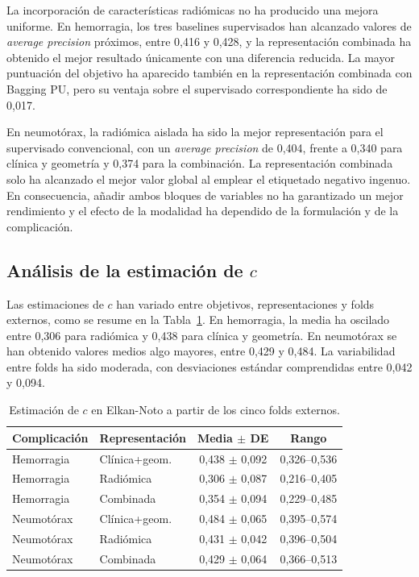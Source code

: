 La incorporación de características radiómicas no ha producido una mejora uniforme. En hemorragia, los tres baselines supervisados han alcanzado valores de \textit{average precision} próximos, entre 0,416 y 0,428, y la representación combinada ha obtenido el mejor resultado únicamente con una diferencia reducida. La mayor puntuación del objetivo ha aparecido también en la representación combinada con Bagging PU, pero su ventaja sobre el supervisado correspondiente ha sido de 0,017.

En neumotórax, la radiómica aislada ha sido la mejor representación para el supervisado convencional, con un \textit{average precision} de 0,404, frente a 0,340 para clínica y geometría y 0,374 para la combinación. La representación combinada solo ha alcanzado el mejor valor global al emplear el etiquetado negativo ingenuo. En consecuencia, añadir ambos bloques de variables no ha garantizado un mejor rendimiento y el efecto de la modalidad ha dependido de la formulación y de la complicación.

\subsection{Análisis de la estimación de \(c\)}

Las estimaciones de \(c\) han variado entre objetivos, representaciones y folds externos, como se resume en la Tabla~\ref{tab:pu_estimacion_c}. En hemorragia, la media ha oscilado entre 0,306 para radiómica y 0,438 para clínica y geometría. En neumotórax se han obtenido valores medios algo mayores, entre 0,429 y 0,484. La variabilidad entre folds ha sido moderada, con desviaciones estándar comprendidas entre 0,042 y 0,094.

\begin{table}[!htbp]
\centering
\caption{Estimación de \(c\) en Elkan-Noto a partir de los cinco folds externos.}
\label{tab:pu_estimacion_c}
\small
\begin{tabular}{llcc}
\toprule
\textbf{Complicación} & \textbf{Representación} & \textbf{Media $\pm$ DE} & \textbf{Rango} \\
\midrule
Hemorragia & Clínica+geom. & 0,438 $\pm$ 0,092 & 0,326--0,536 \\
Hemorragia & Radiómica & 0,306 $\pm$ 0,087 & 0,216--0,405 \\
Hemorragia & Combinada & 0,354 $\pm$ 0,094 & 0,229--0,485 \\
\midrule
Neumotórax & Clínica+geom. & 0,484 $\pm$ 0,065 & 0,395--0,574 \\
Neumotórax & Radiómica & 0,431 $\pm$ 0,042 & 0,396--0,504 \\
Neumotórax & Combinada & 0,429 $\pm$ 0,064 & 0,366--0,513 \\
\bottomrule
\end{tabular}
\end{table}

